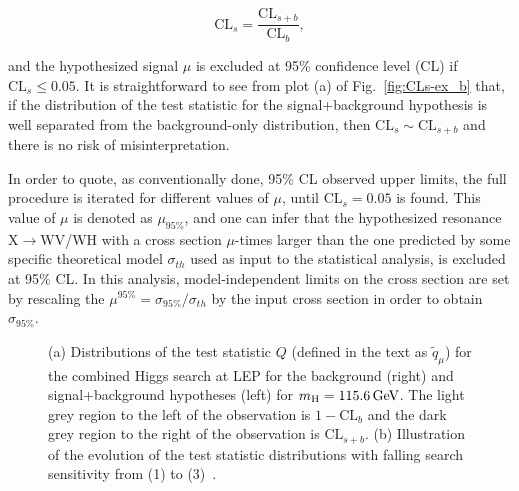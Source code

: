 \begin{equation}
\mathrm{CL}_s = \frac{\mathrm{CL}_{s+b}}{\mathrm{CL}_b},
\end{equation}

\noindent and the hypothesized signal $\mu$ is excluded at 95\% confidence level (CL) if $\mathrm{CL}_s \leq 0.05$.
It is straightforward to see from plot (a) of Fig.~\ref{fig:CLs-ex_b} that, if the distribution of the test statistic for the signal+background hypothesis
is well separated from the background-only distribution, then $\mathrm{CL}_s \sim \mathrm{CL}_{s+b}$ and there is no risk of misinterpretation.

In order to quote, as conventionally done, 95\% CL observed upper limits, the full procedure is iterated for different values of $\mu$, until $\mathrm{CL}_s = 0.05$ is found.
This value of $\mu$ is denoted as $\mu_{95\%}$, and one can infer that the hypothesized resonance X$\rightarrow$WV/WH with a cross section $\mu$-times larger than the one predicted 
by some specific theoretical model $\sigma_{th}$ used as input to the statistical analysis, is excluded at 95\% CL.
In this analysis, model-independent limits on the cross section are set by rescaling the $\mu^{95\%} = \sigma_{95\%}/\sigma_{th}$ by the input cross section in order to obtain $\sigma_{95\%}$.

\begin{figure}[!htb]
\centering
{}
\caption{(a) Distributions of the test statistic $Q$ (defined in the text as $\tilde{q}_\mu$) for the combined Higgs search at LEP for the background (right) and signal+background hypotheses (left) for $m_\mathrm{H} = 115.6\,\text{Ge\hspace{-.08em}V}$.
The light grey region to the left of the observation is $1-\mathrm{CL}_b$ and the dark grey region to the right of the observation is $\mathrm{CL}_{s+b}$. (b) Illustration of the evolution of the test statistic distributions with falling search sensitivity from (1) to (3)~\cite{CLs1}.}
\label{fig:CLs-ex}
\end{figure}

